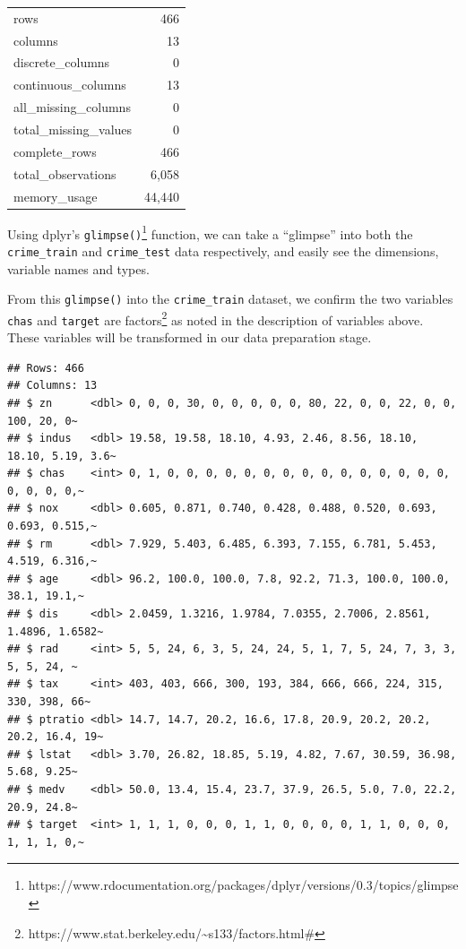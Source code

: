 \documentclass[3p]{elsarticle} %
\begin{document}
\begin{tabular}{l|r}
\hline
  & \\
\hline
rows & 466\\
\hline
columns & 13\\
\hline
discrete\_columns & 0\\
\hline
continuous\_columns & 13\\
\hline
all\_missing\_columns & 0\\
\hline
total\_missing\_values & 0\\
\hline
complete\_rows & 466\\
\hline
total\_observations & 6,058\\
\hline
memory\_usage & 44,440\\
\hline
\end{tabular}

Using dplyr's \texttt{glimpse()}\footnote{https://www.rdocumentation.org/packages/dplyr/versions/0.3/topics/glimpse}
function, we can take a ``glimpse'' into both the \texttt{crime\_train}
and \texttt{crime\_test} data respectively, and easily see the
dimensions, variable names and types.

From this \texttt{glimpse()} into the \texttt{crime\_train} dataset, we
confirm the two variables \texttt{chas} and \texttt{target} are
factors\footnote{https://www.stat.berkeley.edu/\textasciitilde s133/factors.html\#}
as noted in the description of variables above. These variables will be
transformed in our data preparation stage.

\begin{verbatim}
## Rows: 466
## Columns: 13
## $ zn      <dbl> 0, 0, 0, 30, 0, 0, 0, 0, 0, 80, 22, 0, 0, 22, 0, 0, 100, 20, 0~
## $ indus   <dbl> 19.58, 19.58, 18.10, 4.93, 2.46, 8.56, 18.10, 18.10, 5.19, 3.6~
## $ chas    <int> 0, 1, 0, 0, 0, 0, 0, 0, 0, 0, 0, 0, 0, 0, 0, 0, 0, 0, 0, 0, 0,~
## $ nox     <dbl> 0.605, 0.871, 0.740, 0.428, 0.488, 0.520, 0.693, 0.693, 0.515,~
## $ rm      <dbl> 7.929, 5.403, 6.485, 6.393, 7.155, 6.781, 5.453, 4.519, 6.316,~
## $ age     <dbl> 96.2, 100.0, 100.0, 7.8, 92.2, 71.3, 100.0, 100.0, 38.1, 19.1,~
## $ dis     <dbl> 2.0459, 1.3216, 1.9784, 7.0355, 2.7006, 2.8561, 1.4896, 1.6582~
## $ rad     <int> 5, 5, 24, 6, 3, 5, 24, 24, 5, 1, 7, 5, 24, 7, 3, 3, 5, 5, 24, ~
## $ tax     <int> 403, 403, 666, 300, 193, 384, 666, 666, 224, 315, 330, 398, 66~
## $ ptratio <dbl> 14.7, 14.7, 20.2, 16.6, 17.8, 20.9, 20.2, 20.2, 20.2, 16.4, 19~
## $ lstat   <dbl> 3.70, 26.82, 18.85, 5.19, 4.82, 7.67, 30.59, 36.98, 5.68, 9.25~
## $ medv    <dbl> 50.0, 13.4, 15.4, 23.7, 37.9, 26.5, 5.0, 7.0, 22.2, 20.9, 24.8~
## $ target  <int> 1, 1, 1, 0, 0, 0, 1, 1, 0, 0, 0, 0, 1, 1, 0, 0, 0, 1, 1, 1, 0,~
\end{verbatim}
\end{document}
